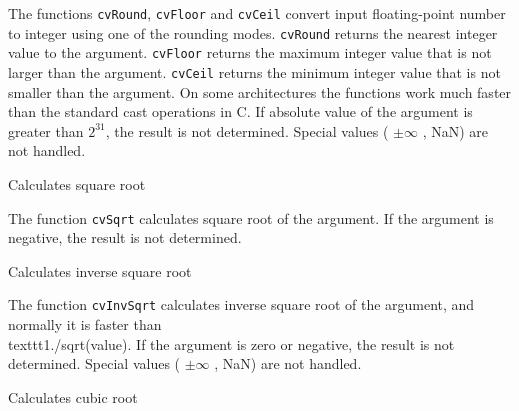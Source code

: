 The functions \texttt{cvRound}, \texttt{cvFloor} and \texttt{cvCeil}
convert input floating-point number to integer using one of the rounding
modes. \texttt{cvRound} returns the nearest integer value to the
argument. \texttt{cvFloor} returns the maximum integer value that is not
larger than the argument. \texttt{cvCeil} returns the minimum integer
value that is not smaller than the argument. On some architectures the
functions work much faster than the standard cast
operations in C. If absolute value of the argument is greater than
$2^{31}$, the result is not determined. Special values ( $ \pm \infty$ , NaN)
are not handled.

\label{Sqrt}

Calculates square root


\begin{description}
\end{description}


The function \texttt{cvSqrt} calculates square root of the argument. If the argument is negative, the result is not determined.

\label{InvSqrt}

Calculates inverse square root


\begin{description}
\end{description}


The function \texttt{cvInvSqrt} calculates inverse square root of the argument, and normally it is faster than \\texttt{1./sqrt(value)}. If the argument is zero or negative, the result is not determined. Special values ( $ \pm \infty $ , NaN) are not handled.

\label{Cbrt}

Calculates cubic root


\begin{description}
\end{description}


